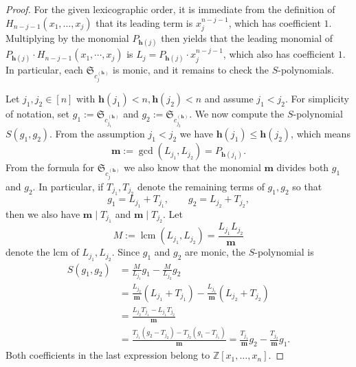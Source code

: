 \documentclass[11pt]{amsart}
\theoremstyle{plain}
\theoremstyle{definition}
\newcommand{\hess}{{\mathbf h}}
\numberwithin{equation}{section}
\begin{document}
\begin{proof}
For the given lexicographic order, it is immediate from the definition of $H_{n-j-1}(x_1,\ldots,x_j)$ that its leading term is $x_j^{n-j-1}$, which has coefficient $1$. Multiplying by the monomial $P_{\hess(j)}$ then yields that the leading monomial of $P_{\hess(j)}\cdot H_{n-j-1}(x_1,\cdots,x_j)$ is $L_j = P_{\hess(j)} \cdot x_j^{n-j-1}$, which also has coefficient $1$. 
In particular, each $\mathfrak{S}_{c_j^{(\hess)}}$ is monic, and it remains to check the $S$-polynomials.

Let $j_1,j_2 \in [n]$ with $\hess(j_1)<n, \hess(j_2)<n$ and assume $j_1<j_2$. For simplicity of notation, set $g_1 := \mathfrak{S}_{c_{j_1}^{(\hess)}}$ and $g_2 := \mathfrak{S}_{c_{j_2}^{(\hess)}}$. We now compute the $S$-polynomial $S(g_1,g_2)$. 
From the assumption $j_1< j_2$ we have $\hess(j_1) \leq \hess(j_2)$, which means 
\[
\mathbf{m}:=\gcd(L_{j_1},L_{j_2})=P_{\hess(j_1)}.
\]
From the formula for $\mathfrak{S}_{c_j^{(\hess)}}$ we also know that the monomial $\mathbf{m}$ divides both $g_1$ and $g_2$.
In particular, if $T_{j_1},T_{j_2}$ denote the remaining terms of $g_1,g_2$ so that 
\[
g_1=L_{j_1}+T_{j_1},\qquad g_2=L_{j_2}+T_{j_2},
\]
then we also have $\mathbf{m}\mid T_{j_1}$ and $\mathbf{m}\mid T_{j_2}$.
Let
\[
M:=\operatorname{lcm}(L_{j_1},L_{j_2})=\frac{L_{j_1}L_{j_2}}{\mathbf{m}}
\]
denote the lcm of $L_{j_1},L_{j_2}$. 
Since $g_1$ and $g_2$ are monic, the $S$-polynomial is
\begin{align*}
S(g_1,g_2)
&=\frac{M}{L_{j_1}}g_1-\frac{M}{L_{j_2}}g_2\\
&=\frac{L_{j_2}}{\mathbf{m}}(L_{j_1}+T_{j_1})
  -\frac{L_{j_1}}{\mathbf{m}}(L_{j_2}+T_{j_2})\\
&=\frac{L_{j_2}T_{j_1}-L_{j_1}T_{j_2}}{\mathbf{m}}\\
&=\frac{T_{j_1}(g_2-T_{j_2})-T_{j_2}(g_1-T_{j_1})}{\mathbf{m}} =\frac{T_{j_1}}{\mathbf{m}}g_{2}-\frac{T_{j_2}}{\mathbf{m}}g_1.
\end{align*}
Both coefficients in the last expression belong to
$\mathbb{Z}[x_1,\ldots,x_n]$.


\end{proof}
\end{document}
